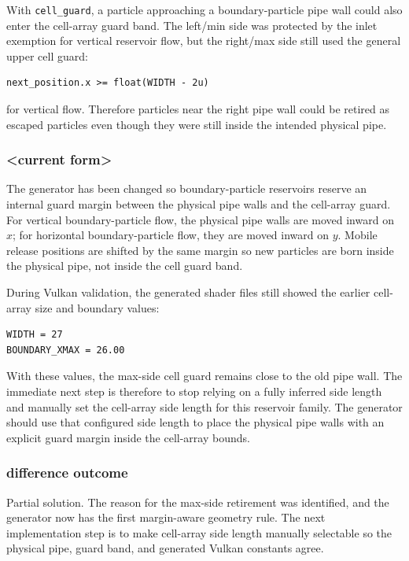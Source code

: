 With \texttt{cell\_guard}, a particle approaching a boundary-particle pipe
wall could also enter the cell-array guard band.  The left/min side was
protected by the inlet exemption for vertical reservoir flow, but the right/max
side still used the general upper cell guard:
\begin{verbatim}
next_position.x >= float(WIDTH - 2u)
\end{verbatim}
for vertical flow.  Therefore particles near the right pipe wall could be
retired as escaped particles even though they were still inside the intended
physical pipe.

\subsubsection{<current form>}

The generator has been changed so boundary-particle reservoirs reserve an
internal guard margin between the physical pipe walls and the cell-array
guard.  For vertical boundary-particle flow, the physical pipe walls are moved
inward on \(x\); for horizontal boundary-particle flow, they are moved inward
on \(y\).  Mobile release positions are shifted by the same margin so new
particles are born inside the physical pipe, not inside the cell guard band.

During Vulkan validation, the generated shader files still showed the earlier
cell-array size and boundary values:
\begin{verbatim}
WIDTH = 27
BOUNDARY_XMAX = 26.00
\end{verbatim}
With these values, the max-side cell guard remains close to the old pipe wall.
The immediate next step is therefore to stop relying on a fully inferred side
length and manually set the cell-array side length for this reservoir family.
The generator should use that configured side length to place the physical
pipe walls with an explicit guard margin inside the cell-array bounds.

\subsubsection{difference outcome}

Partial solution.  The reason for the max-side retirement was identified, and
the generator now has the first margin-aware geometry rule.  The next
implementation step is to make cell-array side length manually selectable so
the physical pipe, guard band, and generated Vulkan constants agree.

